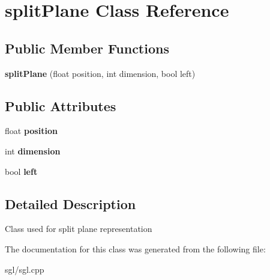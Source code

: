 \hypertarget{classsplit_plane}{}\section{split\+Plane Class Reference}
\label{classsplit_plane}
\subsection*{Public Member Functions}
\begin{DoxyCompactItemize}
\item 
\mbox{\label{classsplit_plane_a816412b8c1b3f5b871fff0d8f372f287}} 
{\bfseries split\+Plane} (float position, int dimension, bool left)
\end{DoxyCompactItemize}
\subsection*{Public Attributes}
\begin{DoxyCompactItemize}
\item 
\mbox{\label{classsplit_plane_ad814131a437d5145b440a7589d37c10b}} 
float {\bfseries position}
\item 
\mbox{\label{classsplit_plane_a18948f11f0776d35adf861b198554380}} 
int {\bfseries dimension}
\item 
\mbox{\label{classsplit_plane_aa261e4e8ae1c7e16efa1069c8eb3aaca}} 
bool {\bfseries left}
\end{DoxyCompactItemize}


\subsection{Detailed Description}
Class used for split plane representation 

The documentation for this class was generated from the following file\+:\begin{DoxyCompactItemize}
\item 
sgl/sgl.\+cpp\end{DoxyCompactItemize}
